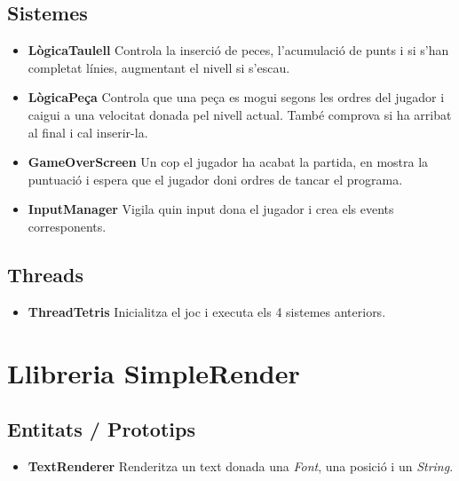     \subsection{Sistemes}

      \begin{itemize}
        \item {\bf LògicaTaulell}
          Controla la inserció de peces, l'acumulació de punts i si s'han completat línies, augmentant el nivell si s'escau.
          
        \item {\bf LògicaPeça}
          Controla que una peça es mogui segons les ordres del jugador i caigui a una velocitat donada pel nivell actual. També comprova si ha arribat al final i cal inserir-la.
          
        \item {\bf GameOverScreen}
          Un cop el jugador ha acabat la partida, en mostra la puntuació i espera que el jugador doni ordres de tancar el programa.
          
        \item {\bf InputManager}
          Vigila quin input dona el jugador i crea els events corresponents.
          
      \end{itemize}
      
    \subsection{Threads}
    
      \begin{itemize}
        \item {\bf ThreadTetris}
          Inicialitza el joc i executa els 4 sistemes anteriors.
          
      \end{itemize}
    
  \section{Llibreria SimpleRender}

    \subsection{Entitats / Prototips}

      \begin{itemize}
        \item {\bf TextRenderer}
          Renderitza un text donada una {\em Font}, una posició i un {\em String}.
      \end{itemize}


